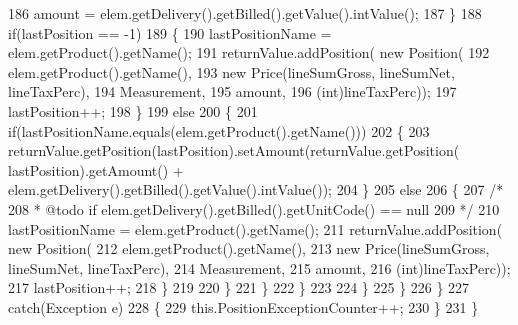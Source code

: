 \begin{DoxyCode}
186                             amount = elem.getDelivery().getBilled().getValue().intValue();
187                         \}
188                         \textcolor{keywordflow}{if}(lastPosition == -1)
189                         \{
190                             lastPositionName = elem.getProduct().getName();
191                             returnValue.addPosition( \textcolor{keyword}{new} Position(
192                                     elem.getProduct().getName(),
193                                     \textcolor{keyword}{new} Price(lineSumGross, lineSumNet, lineTaxPerc),
194                                     Measurement,
195                                     amount,
196                                     (int)lineTaxPerc));
197                             lastPosition++;
198                         \}
199                         \textcolor{keywordflow}{else}
200                         \{
201                             \textcolor{keywordflow}{if}(lastPositionName.equals(elem.getProduct().getName()))
202                             \{
203                                 returnValue.getPosition(lastPosition).setAmount(returnValue.getPosition(
      lastPosition).getAmount() + elem.getDelivery().getBilled().getValue().intValue());
204                             \}
205                             \textcolor{keywordflow}{else}
206                             \{
207                                 \textcolor{comment}{/* }
208 \textcolor{comment}{                                 * @todo if elem.getDelivery().getBilled().getUnitCode() == null}
209 \textcolor{comment}{                                 */}
210                                 lastPositionName = elem.getProduct().getName();
211                                 returnValue.addPosition( \textcolor{keyword}{new} Position(
212                                         elem.getProduct().getName(),
213                                         \textcolor{keyword}{new} Price(lineSumGross, lineSumNet, lineTaxPerc),
214                                         Measurement,
215                                         amount,
216                                         (int)lineTaxPerc));
217                                 lastPosition++;     
218                             \}
219 
220                         \}
221                     \}
222                 \}
223                 
224             \}
225         \}
226         \}
227         \textcolor{keywordflow}{catch}(Exception e)
228         \{
229             this.PositionExceptionCounter++;
230         \}
231     \}
\end{DoxyCode}
